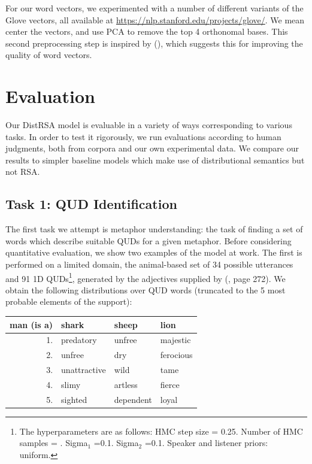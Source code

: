 \documentclass[10pt,letterpaper,twocolumn]{article}
\begin{document}
For our word vectors, we experimented with a number of different variants of the Glove vectors, all available at \url{https://nlp.stanford.edu/projects/glove/}. We mean center the vectors, and use PCA to remove the top 4 orthonomal bases. This second preprocessing step is inspired by (\cite{mu2016geometry}), which suggests this for improving the quality of word vectors.




\section{Evaluation}

Our DistRSA model is evaluable in a variety of ways corresponding to various tasks. In order to test it rigorously, we run evaluations according to human judgments, both from corpora and our own experimental data. We compare our results to simpler baseline models which make use of distributional semantics but not RSA.

\subsection{Task 1: QUD Identification}


The first task we attempt is metaphor understanding: the task of finding a set of words which describe suitable QUDs for a given metaphor. Before considering quantitative evaluation, we show two examples of the model at work. The first is performed on a limited domain, the animal-based set of 34 possible utterances and 91 1D QUDs\footnote{The hyperparameters are as follows: HMC step size = 0.25. Number of HMC samples = . Sigma$_1$ =0.1. Sigma$_2$ =0.1. Speaker and listener priors: uniform.}, generated by the adjectives supplied by (\cite{kao}, page 272). We obtain the following distributions over QUD words (truncated to the 5 most probable elements of the support):




\begin{table}[ht]
	\label{tab:foo}
	\centering
	\begin{tabular}{rlll}
	man (is a) & shark & sheep & lion \\\toprule
	1. & predatory & unfree & majestic \\
	2. & unfree & dry & ferocious \\
	3. & unattractive & wild & tame \\
	4. & slimy & artless & fierce \\
	5. & sighted & dependent & loyal \\\bottomrule
	\end{tabular}
\end{table}
\end{document}

